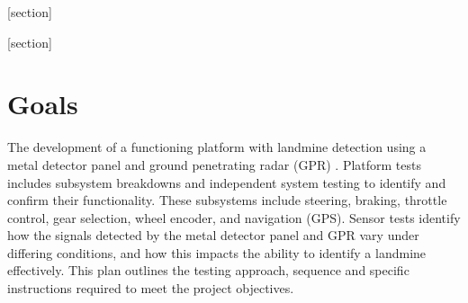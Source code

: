 \documentclass[main.tex]{subfiles}
\begin{document}
\begin{appendices}
[section]
\renewcommand*{\thegpr}{%
  \ifnum\value{gpr}<1 0 \fi%
  \arabic{gpr}%
}
\newenvironment{gpr}[1][]{\refstepcounter{gpr}\par\medskip\indent{}
   \textbf{TC 3.\thegpr:#1} \rmfamily}{\bigskip}

[section]
\renewcommand*{\themds}{%
  \ifnum\value{mds}<1 0 \fi%
  \arabic{mds}%
}
\newenvironment{mds}[1][]{\refstepcounter{mds}\par\medskip\indent{}
   \textbf{TC 2.\themds:#1} \rmfamily}{\bigskip}

\section{Goals}
The development of a functioning platform with landmine detection using a metal detector panel and ground penetrating radar (GPR) . Platform tests includes subsystem breakdowns and independent system testing to identify and confirm their functionality. These subsystems include steering, braking, throttle control, gear selection, wheel encoder, and navigation (GPS). Sensor tests identify how the signals detected by the metal detector panel and GPR vary under differing conditions, and how this impacts the ability to identify a landmine effectively. This plan outlines the testing approach, sequence and specific instructions required to meet the project objectives. 




\end{appendices}
\end{document}
